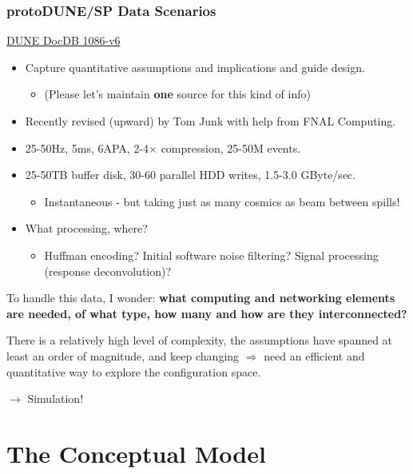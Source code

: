 \documentclass[xcolor=dvipsnames]{beamer}
\begin{document}
\begin{frame} 
  \frametitle{protoDUNE/SP Data Scenarios}
  \href{http://docs.dunescience.org:8080/cgi-bin/ShowDocument?docid=1086}{DUNE DocDB 1086-v6}
  \begin{itemize}\footnotesize
  \item Capture quantitative assumptions and implications and guide design.
    \begin{itemize}\scriptsize
    \item (Please let's maintain \textbf{one} source for this kind of info)
    \end{itemize}
  \item Recently revised (upward) by Tom Junk with help from FNAL Computing.
  \item 25-50Hz, 5ms, 6APA, 2-4$\times$ compression, 25-50M events.
  \item 25-50TB buffer disk, 30-60 parallel HDD writes, 1.5-3.0 GByte/sec.
    \begin{itemize}  \scriptsize
    \item Instantaneous - but taking just as many cosmics as beam between spills!
    \end{itemize}
  \item What processing, where?
    \begin{itemize}  \scriptsize
    \item Huffman encoding?  Initial software noise filtering?  Signal
      processing (response deconvolution)?
    \end{itemize}
  \end{itemize}

  \vfill

  \footnotesize

  To handle this data, I wonder: \textbf{what computing and networking
  elements are needed, of what type, how many and how are they
  interconnected?} 

  \vfill

  There is a relatively high level of complexity, the assumptions have
  spanned at least an order of magnitude, and keep changing
  $\Rightarrow$ need an efficient and quantitative way to explore the
  configuration space.

  \vfill
  $\rightarrow$ Simulation!
\end{frame}

\section{The Conceptual Model}
\end{document}
